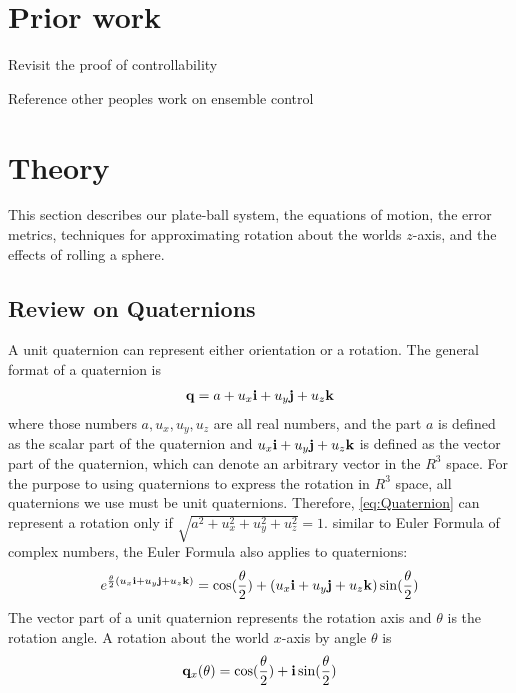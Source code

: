 \documentclass[letter paper, 10pt, conference]{ieeeconf}
\newcommand{\todo}[1]{\vspace{5 mm}\par \noindent \framebox{\begin{minipage}[c]{0.98 \columnwidth} \ttfamily\flushleft \textcolor{red}{#1}\end{minipage}}\vspace{5 mm}\par}
\begin{document}
\section{Prior work}\label{sec:PriorWork}%


Revisit the proof of controllability
\todo{ insert proof}

Reference other peoples work on ensemble control


\section{Theory}\label{sec:theory}%

This section describes our plate-ball system, the equations of motion, the error metrics, techniques for approximating rotation about the worlds $z$-axis, and the effects of rolling a sphere.

\subsection{Review on Quaternions}

A unit quaternion can represent either orientation or a rotation.  The general format of a quaternion is
\begin{align}
{\bf q} = a+u_x{\bf i}+u_y{\bf j}+u_z{\bf k}\label{eq:Quaternion}
\end{align}
where those numbers $a,u_x,u_y,u_z$ are all real numbers, and the part $a$ is defined as the scalar part of the quaternion and $u_x{\bf i}+u_y{\bf j}+u_z{\bf k}$ is defined as the vector part of the quaternion, which can denote an arbitrary vector in the $R^3$ space. For the purpose to using quaternions to express the rotation in $R^3$ space, all quaternions we use must be unit quaternions. Therefore, \eqref{eq:Quaternion} can represent a rotation only if $\sqrt{a^2+u_x^2+u_y^2+u_z^2}=1$.
similar to Euler Formula of complex numbers, the Euler Formula also applies to quaternions:
\begin{align}
e^{\frac{\theta}{2} (u_x{\bf i}+u_y{\bf j}+u_z{\bf k})}=\cos(\frac{\theta}{2})+(u_x{\bf i}+u_y{\bf j}+u_z{\bf k})\sin(\frac{\theta}{2})\label{eq:quaternionsEuler}
\end{align}
The vector part of a unit quaternion represents the rotation axis and $\theta$ is the rotation angle.
A rotation about the world $x$-axis by angle $\theta$ is
\begin{align}
 {\bf q}_x(\theta) = \cos( \frac{\theta}{2})+{\bf i}\sin(\frac{\theta}{2}) \label{eq:QuaternionXaxis}
\end{align}
\end{document}
